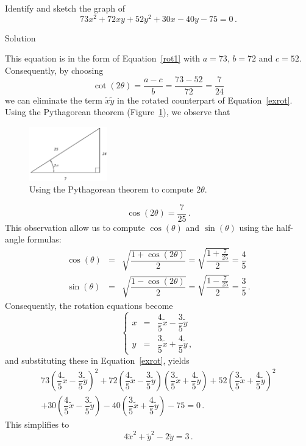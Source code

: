\begin{example}
Identify and sketch the graph of 
\begin{equation}
73x^2+72xy+52y^2+30x-40y-75=0\,.
\label{exrot}
\end{equation}

Solution 

This equation is in the form of Equation~\eqref{rot1} with $a=73$, $b=72$ and $c=52$. Consequently, by choosing 
$$
\cot(2\theta)=\dfrac{a-c}{b}=\dfrac{73-52}{72}=\dfrac{7}{24}
$$
we can eliminate the term $\widetilde{x}\widetilde{y}$ in the rotated counterpart of Equation~\eqref{exrot}. Using the Pythagorean theorem (Figure~\ref{fig_trans_46}), we observe that

\begin{figure}[H]
	\begin{center}
			\includegraphics[width=0.3\textwidth]{fig_trans_46}
	\caption{Using the Pythagorean theorem to compute $2\theta$.}
	\label{fig_trans_46}
	\end{center}
\end{figure}

$$
\cos(2\theta)=\dfrac{7}{25}\,.
$$
This observation allow us to compute $\cos(\theta)$ and $\sin(\theta)$ using the half-angle formulas:
$$
\begin{array}{rcl}
\cos(\theta) & = & \sqrt{\dfrac{1+\cos(2\theta)}{2}}=\sqrt{\dfrac{1+\frac{7}{25}}{2}}=\dfrac{4}{5}\\[.2cm]
\sin(\theta) & = & \sqrt{\dfrac{1-\cos(2\theta)}{2}}=\sqrt{\dfrac{1-\frac{7}{25}}{2}}=\dfrac{3}{5}\,. 
\end{array}
$$
Consequently, the rotation equations become
$$
\left\{ 
\begin{array}{rcl}
x & = & \dfrac{4}{5}\widetilde{x}-\dfrac{3}{5}\widetilde{y}\\[.2cm]
y & = & \dfrac{3}{5}\widetilde{x}+\dfrac{4}{5}\widetilde{y}\,,
\end{array}\right.
$$
and substituting these in Equation~\eqref{exrot}, yields
\begin{multline*}
73\left(\dfrac{4}{5}\widetilde{x}-\dfrac{3}{5}\widetilde{y}\right)^2+72\left(\dfrac{4}{5}\widetilde{x}-\dfrac{3}{5}\widetilde{y}\right)\left(\dfrac{3}{5}\widetilde{x}+\dfrac{4}{5}\widetilde{y}\right)+52\left(\dfrac{3}{5}\widetilde{x}+\dfrac{4}{5}\widetilde{y}\right)^2\\[0.2cm]
+30\left(\dfrac{4}{5}\widetilde{x}-\dfrac{3}{5}\widetilde{y}\right)-40\left(\dfrac{3}{5}\widetilde{x}+\dfrac{4}{5}\widetilde{y}\right)-75=0\,.
\end{multline*}
This simplifies to
$$
4\widetilde{x}^2+\widetilde{y}^2-2\widetilde{y}=3\,.
$$


\end{example}
